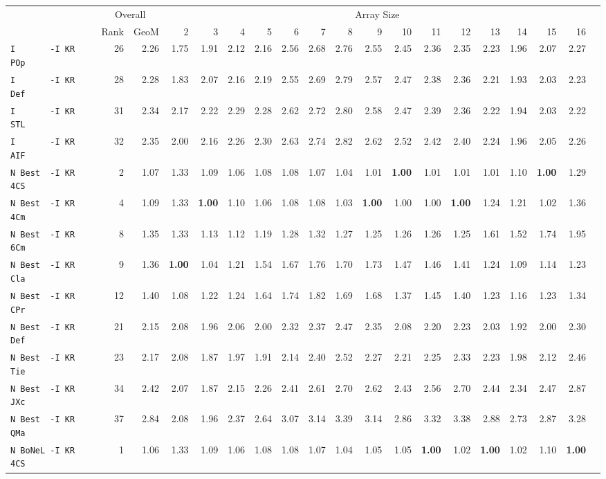 \begin{tabular}{l | r @{~~} r | r@{~~}r@{~~}r@{~~}r@{~~}r@{~~}r@{~~}r@{~~}r@{~~}r@{~~}r@{~~}r@{~~}r@{~~}r@{~~}r@{~~}r@{~~}r|}
 & \multicolumn{2}{c|}{Overall} & \multicolumn{15}{c}{Array Size} \\
 & Rank & GeoM & 2&3&4&5&6&7&8&9&10&11&12&13&14&15&16\\ \hline
\verb+I       -I KR POp+ & 26 & 2.26 & 1.75&1.91&2.12&2.16&2.56&2.68&2.76&2.55&2.45&2.36&2.35&2.23&1.96&2.07&2.27\\
\verb+I       -I KR Def+ & 28 & 2.28 & 1.83&2.07&2.16&2.19&2.55&2.69&2.79&2.57&2.47&2.38&2.36&2.21&1.93&2.03&2.23\\
\verb+I       -I KR STL+ & 31 & 2.34 & 2.17&2.22&2.29&2.28&2.62&2.72&2.80&2.58&2.47&2.39&2.36&2.22&1.94&2.03&2.22\\
\verb+I       -I KR AIF+ & 32 & 2.35 & 2.00&2.16&2.26&2.30&2.63&2.74&2.82&2.62&2.52&2.42&2.40&2.24&1.96&2.05&2.26\smallskip \\
\verb+N Best  -I KR 4CS+ & 2 & 1.07 & 1.33&1.09&1.06&1.08&1.08&1.07&1.04&1.01&\textbf{1.00}&1.01&1.01&1.01&1.10&\textbf{1.00}&1.29\\
\verb+N Best  -I KR 4Cm+ & 4 & 1.09 & 1.33&\textbf{1.00}&1.10&1.06&1.08&1.08&1.03&\textbf{1.00}&1.00&1.00&\textbf{1.00}&1.24&1.21&1.02&1.36\\
\verb+N Best  -I KR 6Cm+ & 8 & 1.35 & 1.33&1.13&1.12&1.19&1.28&1.32&1.27&1.25&1.26&1.26&1.25&1.61&1.52&1.74&1.95\\
\verb+N Best  -I KR Cla+ & 9 & 1.36 & \textbf{1.00}&1.04&1.21&1.54&1.67&1.76&1.70&1.73&1.47&1.46&1.41&1.24&1.09&1.14&1.23\\
\verb+N Best  -I KR CPr+ & 12 & 1.40 & 1.08&1.22&1.24&1.64&1.74&1.82&1.69&1.68&1.37&1.45&1.40&1.23&1.16&1.23&1.34\\
\verb+N Best  -I KR Def+ & 21 & 2.15 & 2.08&1.96&2.06&2.00&2.32&2.37&2.47&2.35&2.08&2.20&2.23&2.03&1.92&2.00&2.30\\
\verb+N Best  -I KR Tie+ & 23 & 2.17 & 2.08&1.87&1.97&1.91&2.14&2.40&2.52&2.27&2.21&2.25&2.33&2.23&1.98&2.12&2.46\\
\verb+N Best  -I KR JXc+ & 34 & 2.42 & 2.07&1.87&2.15&2.26&2.41&2.61&2.70&2.62&2.43&2.56&2.70&2.44&2.34&2.47&2.87\\
\verb+N Best  -I KR QMa+ & 37 & 2.84 & 2.08&1.96&2.37&2.64&3.07&3.14&3.39&3.14&2.86&3.32&3.38&2.88&2.73&2.87&3.28\smallskip \\
\verb+N BoNeL -I KR 4CS+ & 1 & 1.06 & 1.33&1.09&1.06&1.08&1.08&1.07&1.04&1.05&1.05&\textbf{1.00}&1.02&\textbf{1.00}&1.02&1.10&\textbf{1.00}\\

\end{tabular}
